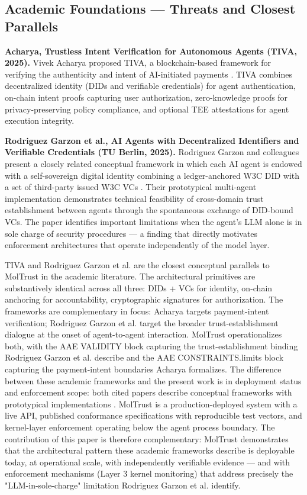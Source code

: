 \subsection{Academic Foundations — Threats and Closest Parallels}

\textbf{Acharya, Trustless Intent Verification for Autonomous Agents (TIVA, 2025).} Vivek Acharya proposed TIVA, a blockchain-based framework for verifying the authenticity and intent of AI-initiated payments \cite{ref17_acharya}. TIVA combines decentralized identity (DIDs and verifiable credentials) for agent authentication, on-chain intent proofs capturing user authorization, zero-knowledge proofs for privacy-preserving policy compliance, and optional TEE attestations for agent execution integrity.


\textbf{Rodriguez Garzon et al., AI Agents with Decentralized Identifiers and Verifiable Credentials (TU Berlin, 2025).} Rodriguez Garzon and colleagues present a closely related conceptual framework in which each AI agent is endowed with a self-sovereign digital identity combining a ledger-anchored W3C DID with a set of third-party issued W3C VCs \cite{ref36_rodriguezgarzon}. Their prototypical multi-agent implementation demonstrates technical feasibility of cross-domain trust establishment between agents through the spontaneous exchange of DID-bound VCs. The paper identifies important limitations when the agent's LLM alone is in sole charge of security procedures — a finding that directly motivates enforcement architectures that operate independently of the model layer.


TIVA and Rodriguez Garzon et al. are the closest conceptual parallels to MolTrust in the academic literature. The architectural primitives are substantively identical across all three: DIDs + VCs for identity, on-chain anchoring for accountability, cryptographic signatures for authorization. The frameworks are complementary in focus: Acharya targets payment-intent verification; Rodriguez Garzon et al. target the broader trust-establishment dialogue at the onset of agent-to-agent interaction. MolTrust operationalizes both, with the AAE VALIDITY block capturing the trust-establishment binding Rodriguez Garzon et al. describe and the AAE CONSTRAINTS.limits block capturing the payment-intent boundaries Acharya formalizes. The difference between these academic frameworks and the present work is in deployment status and enforcement scope: both cited papers describe conceptual frameworks with prototypical implementations \cite{ref17_acharya,ref36_rodriguezgarzon}. MolTrust is a production-deployed system with a live API, published conformance specifications with reproducible test vectors, and kernel-layer enforcement operating below the agent process boundary. The contribution of this paper is therefore complementary: MolTrust demonstrates that the architectural pattern these academic frameworks describe is deployable today, at operational scale, with independently verifiable evidence — and with enforcement mechanisms (Layer 3 kernel monitoring) that address precisely the "LLM-in-sole-charge" limitation Rodriguez Garzon et al. identify.


